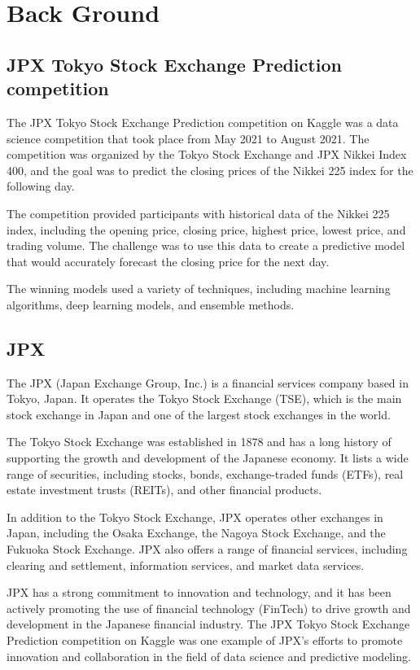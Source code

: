 \documentclass{article}
\begin{document}
\section{Back Ground}
\subsection{JPX Tokyo Stock Exchange Prediction competition}
The JPX Tokyo Stock Exchange Prediction competition on Kaggle was a data science competition that took place from May 2021 to August 2021. The competition was organized by the Tokyo Stock Exchange and JPX Nikkei Index 400, and the goal was to predict the closing prices of the Nikkei 225 index for the following day.

The competition provided participants with historical data of the Nikkei 225 index, including the opening price, closing price, highest price, lowest price, and trading volume. The challenge was to use this data to create a predictive model that would accurately forecast the closing price for the next day.

The winning models used a variety of techniques, including machine learning algorithms, deep learning models, and ensemble methods.

\subsection{JPX}
The JPX (Japan Exchange Group, Inc.) is a financial services company based in Tokyo, Japan. It operates the Tokyo Stock Exchange (TSE), which is the main stock exchange in Japan and one of the largest stock exchanges in the world.

The Tokyo Stock Exchange was established in 1878 and has a long history of supporting the growth and development of the Japanese economy. It lists a wide range of securities, including stocks, bonds, exchange-traded funds (ETFs), real estate investment trusts (REITs), and other financial products.

In addition to the Tokyo Stock Exchange, JPX operates other exchanges in Japan, including the Osaka Exchange, the Nagoya Stock Exchange, and the Fukuoka Stock Exchange. JPX also offers a range of financial services, including clearing and settlement, information services, and market data services.

JPX has a strong commitment to innovation and technology, and it has been actively promoting the use of financial technology (FinTech) to drive growth and development in the Japanese financial industry. The JPX Tokyo Stock Exchange Prediction competition on Kaggle was one example of JPX's efforts to promote innovation and collaboration in the field of data science and predictive modeling.
\end{document}
